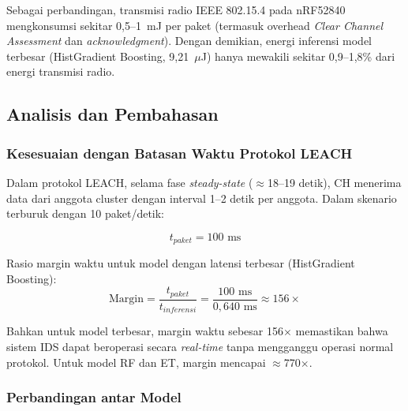 Sebagai perbandingan, transmisi radio IEEE 802.15.4 pada nRF52840 mengkonsumsi sekitar 0,5--1~mJ per paket (termasuk overhead \textit{Clear Channel Assessment} dan \textit{acknowledgment}). Dengan demikian, energi inferensi model terbesar (HistGradient Boosting, 9,21~$\mu$J) hanya mewakili sekitar 0,9--1,8\% dari energi transmisi radio.

\subsection{Analisis dan Pembahasan}

\subsubsection{Kesesuaian dengan Batasan Waktu Protokol LEACH}

Dalam protokol LEACH, selama fase \textit{steady-state} ($\approx$18--19 detik), CH menerima data dari anggota cluster dengan interval 1--2 detik per anggota. Dalam skenario terburuk dengan 10 paket/detik:

\begin{equation}
    t_{paket} = 100 \text{ ms}
\end{equation}

Rasio margin waktu untuk model dengan latensi terbesar (HistGradient Boosting):
\begin{equation}
    \text{Margin} = \frac{t_{paket}}{t_{inferensi}} = \frac{100 \text{ ms}}{0{,}640 \text{ ms}} \approx 156\times
\end{equation}

Bahkan untuk model terbesar, margin waktu sebesar 156$\times$ memastikan bahwa sistem IDS dapat beroperasi secara \textit{real-time} tanpa mengganggu operasi normal protokol. Untuk model RF dan ET, margin mencapai $\approx$770$\times$.

\subsubsection{Perbandingan antar Model}

